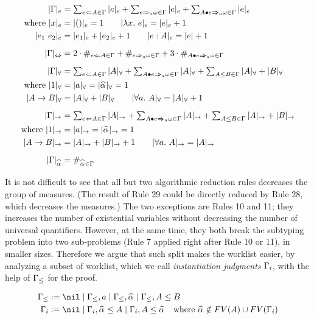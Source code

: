 \begin{definition}
\begin{gather*}
\begin{aligned}
|\Gm|_e &= \textstyle\sum_{e\Lto A\in\Gm}|e|_e + \sum_{e\To_a \jg\in\Gm}|e|_e +
    \sum_{\appInfAlg{A}{e}\in\Gm}|e|_e\\
\text{where } |x|_e &= |()|_e = 1 \qquad |\lam e|_e = |e|_e + 1\\
|e_1~e_2|_e &= |e_1|_e + |e_2|_e + 1 \qquad |e:A|_e = |e| + 1\\[2mm]
%
|\Gm|_\Leftrightarrow &= 2\cdot\#_{e\Lto A\in\Gm} +
    \#_{e\To_a \jg\in\Gm} + 3\cdot\#_{\appInfAlg{A}{e}\in\Gm}\\[2mm]
|\Gm|_\forall &= \textstyle\sum_{e\Lto A\in\Gm}|A|_\forall + \sum_{\appInfAlg{A}{e}\in\Gm}|A|_\forall +
    \sum_{A\le B\in\Gm} |A|_\forall + |B|_\forall\\
\text{where } |1|_\forall &= |a|_\forall = |\al|_\forall = 1\\
|A\to B|_\forall &= |A|_\forall + |B|_\forall \qquad |\all A|_\forall = |A|_\forall + 1\\[2mm]
%
|\Gm|_\to &= \textstyle\sum_{e\Lto A\in\Gm}|A|_\to + \sum_{\appInfAlg{A}{e}\in\Gm}|A|_\to +
    \sum_{A\le B\in\Gm} |A|_\to + |B|_\to\\
\text{where } |1|_\to &= |a|_\to = |\al|_\to = 1\\
|A\to B|_\to &= |A|_\to + |B|_\to + 1 \qquad |\all A|_\to = |A|_\to\\[2mm]
%
|\Gm|_{\al} &= \#_{\al\in\Gm}\\
\end{aligned}
\end{gather*}
\end{definition}

It is not difficult to see that all but two algorithmic reduction rules
decreases the group of measures.
(The result of Rule 29 could be directly reduced by Rule 28, which decreases the measures.)
The two exceptions are Rules 10 and 11; they increases the number of existential variables
without decreasing the number of universal quantifiers.
However, at the same time, they both break the subtyping problem into two sub-problems
(Rule 7 applied right after Rule 10 or 11), in smaller sizes.
Therefore we argue that such split makes the worklist easier, by analyzing a subset of worklist,
which we call \emph{instantiation judgments} $\Gamma_i$, with the help of $\Gamma_\le$ for the proof.

\begin{definition}[$\Gm_\le, \Gm_i$]
\begin{gather*}
\begin{aligned}
\Gm_\le &:= \nil \mid \Gm_\le, a \mid \Gm_\le, \al \mid \Gm_\le, A\le B\\
\Gm_i &:= \nil \mid \Gm_i, \al\le A \mid \Gm_i, A\le\al \quad
    \text{where } \al\notin FV(A) \cup FV(\Gm_i)
\end{aligned}
\end{gather*}
\end{definition}

